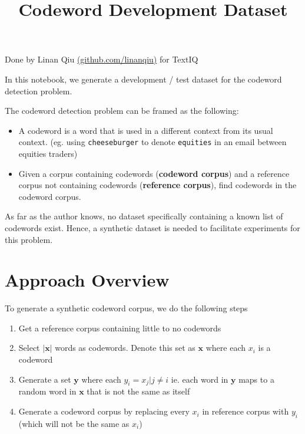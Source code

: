\documentclass{article}
\title{Codeword Development Dataset}
\providecommand{\tightlist}{%
      \setlength{\itemsep}{0pt}\setlength{\parskip}{0pt}}
\begin{document}
    
    
    \maketitle
    
    

    
    Done by Linan Qiu
\href{https://github.com/linanqiu}{(github.com/linanqiu)} for TextIQ

    In this notebook, we generate a development / test dataset for the
codeword detection problem.

The codeword detection problem can be framed as the following:

\begin{itemize}
\tightlist
\item
  A codeword is a word that is used in a different context from its
  usual context. (eg. using \texttt{cheeseburger} to denote
  \texttt{equities} in an email between equities traders)
\item
  Given a corpus containing codewords (\textbf{codeword corpus}) and a
  reference corpus not containing codewords (\textbf{reference corpus}),
  find codewords in the codeword corpus.
\end{itemize}

As far as the author knows, no dataset specifically containing a known
list of codewords exist. Hence, a synthetic dataset is needed to
facilitate experiments for this problem.

\section{Approach Overview}\label{approach-overview}

To generate a synthetic codeword corpus, we do the following steps

\begin{enumerate}
\def\labelenumi{\arabic{enumi}.}
\tightlist
\item
  Get a reference corpus containing little to no codewords
\item
  Select \(|\mathbf{x}|\) words as codewords. Denote this set as
  \(\mathbf{x}\) where each \(x_i\) is a codeword
\item
  Generate a set \(\mathbf{y}\) where each \(y_i = x_j | j \neq i\) ie.
  each word in \(\mathbf{y}\) maps to a random word in \(\mathbf{x}\)
  that is not the same as itself
\item
  Generate a codeword corpus by replacing every \(x_i\) in reference
  corpus with \(y_i\) (which will not be the same as \(x_i\))
\end{enumerate}
\end{document}
